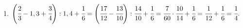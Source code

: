 1. $\left(\cfrac{2}{3}-1,3+\cfrac{3}{4}\right):1,4+\cfrac{1}{6}=\left(\cfrac{17}{12}-\cfrac{13}{10}\right):\cfrac{14}{10}+\cfrac{1}{6}=\cfrac{7}{60}\cdot\cfrac{10}{14}+\cfrac{1}{6}=
\cfrac{1}{12}+\cfrac{1}{6}=\cfrac{1}{4}.$\\
